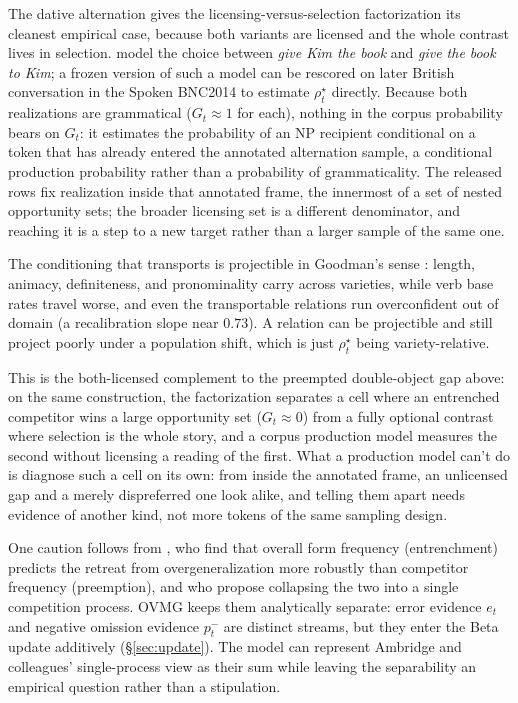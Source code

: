 \documentclass[12pt,letterpaper]{article}
\newcommand{\mention}[1]{\textit{#1}}
\begin{document}
The dative alternation gives the licensing-versus-selection factorization its
cleanest empirical case, because both variants are licensed and the whole
contrast lives in selection. \textcite{bresnan2007} model the choice between
\mention{give Kim the book} and \mention{give the book to Kim}; a frozen version
of such a model can be rescored on later British conversation in the Spoken
BNC2014 to estimate $\rho_t^\star$ directly. Because both realizations are
grammatical ($G_t\approx1$ for each), nothing in the corpus probability bears on
$G_t$: it estimates the probability of an NP recipient conditional on a token
that has already entered the annotated alternation sample, a conditional
production probability rather than a probability of grammaticality. The released
rows fix realization inside that annotated frame, the innermost of a set of
nested opportunity sets; the broader licensing set is a different denominator,
and reaching it is a step to a new target rather than a larger sample of the
same one.

The conditioning that transports is projectible in Goodman's sense \autocite{Goodman1955}: length, animacy, definiteness, and pronominality carry across varieties, while verb base rates travel worse, and even the transportable relations run overconfident out of domain (a recalibration slope near $0.73$). A relation can be projectible and still project poorly under a population shift, which is just $\rho_t^\star$ being variety-relative.

This is the both-licensed complement to the preempted double-object gap above: on the same construction, the factorization separates a cell where an entrenched competitor wins a large opportunity set ($G_t\approx0$) from a fully optional contrast where selection is the whole story, and a corpus production model measures the second without licensing a reading of the first. What a production model can't do is diagnose such a cell on its own: from inside the annotated frame, an unlicensed gap and a merely dispreferred one look alike, and telling them apart needs evidence of another kind, not more tokens of the same sampling design.

One caution follows from \textcite{AmbridgeEtAl2015}, who find that overall form
frequency (entrenchment) predicts the retreat from overgeneralization more
robustly than competitor frequency (preemption), and who propose collapsing the
two into a single competition process. OVMG keeps them analytically
separate: error evidence $e_t$ and negative omission evidence $p_t^-$ are distinct streams,
but they enter the Beta update additively (\S\ref{sec:update}). The model can
represent Ambridge and colleagues' single-process view as their sum
while leaving the separability an empirical question rather than a stipulation.
\end{document}
